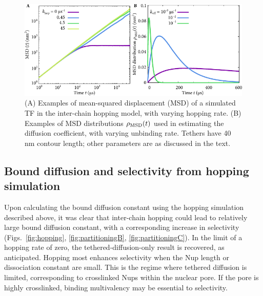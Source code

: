 \begin{figure}[h!]
\centering
\includegraphics[width=0.7\linewidth]{figs/ch02/integrand-example-plots.pdf}
\caption{(A) Examples of mean-squared displacement (MSD) of a simulated TF in the inter-chain hopping model, with varying hopping rate.  (B) Examples of MSD distributions $\rho_{\mathrm{MSD}} (t)$ used in estimating the diffusion coefficient, with varying unbinding rate. Tethers have 40 nm contour length; other parameters are as discussed in the text.}
\label{fig:integrand}
\end{figure}

\subsection{Bound diffusion and selectivity from hopping simulation}

Upon calculating the bound diffusion constant using the hopping simulation described above, it was clear that inter-chain hopping could lead to relatively large bound diffusion constant, with a corresponding increase in selectivity (Figs.~\ref{fig:hopping}, \ref{fig:partitioningB}, \ref{fig:partitioningC}).  In the limit of a hopping rate of zero, the tethered-diffusion-only result is recovered, as anticipated.  Hopping most enhances selectivity when the Nup length or dissociation constant are small.  This is the regime where tethered diffusion is limited, corresponding to crosslinked Nups within the nuclear pore.  If the pore is highly crosslinked, binding multivalency may be essential to selectivity.

